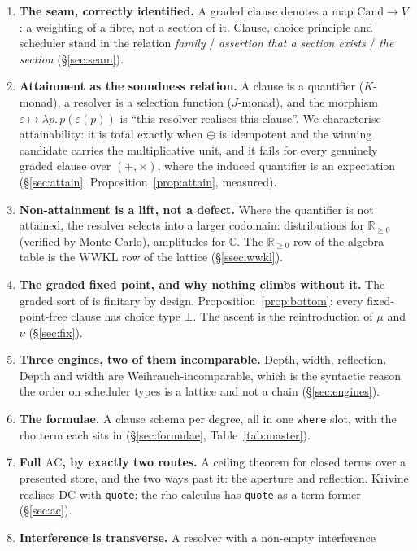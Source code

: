 \documentclass[11pt]{article}
\theoremstyle{definition}
\theoremstyle{plain}
\theoremstyle{remark}
\newcommand{\sumv}{\oplus}
\newcommand{\Rnn}{\mathbb{R}_{\geq 0}}
\newcommand{\Cx}{\mathbb{C}}
\newcommand{\Cand}{\mathrm{Cand}}
\newcommand{\AC}{\mathrm{AC}}
\newcommand{\DC}{\mathrm{DC}}
\newcommand{\WWKL}{\mathrm{WWKL}}
\begin{document}
\begin{enumerate}[label=C\arabic*.,leftmargin=2.6em,itemsep=3pt]
\item \textbf{The seam, correctly identified.} A graded clause denotes a map
$\Cand \to V$: a weighting of a fibre, not a section of it. Clause, choice principle
and scheduler stand in the relation \emph{family} / \emph{assertion that a section
exists} / \emph{the section} (\S\ref{sec:seam}).
\item \textbf{Attainment as the soundness relation.} A clause is a quantifier
($K$-monad), a resolver is a selection function ($J$-monad), and the morphism
$\varepsilon \mapsto \lambda p.\,p(\varepsilon(p))$ is ``this resolver realises this
clause''. We characterise attainability: it is total exactly when $\sumv$ is idempotent
and the winning candidate carries the multiplicative unit, and it fails for every
genuinely graded clause over $(+,\times)$, where the induced quantifier is an
expectation (\S\ref{sec:attain}, Proposition~\ref{prop:attain}, measured).
\item \textbf{Non-attainment is a lift, not a defect.} Where the quantifier is not
attained, the resolver selects into a larger codomain: distributions for $\Rnn$
(verified by Monte Carlo), amplitudes for $\Cx$. The $\Rnn$ row of the algebra table
is the $\WWKL$ row of the lattice (\S\ref{ssec:wwkl}).
\item \textbf{The graded fixed point, and why nothing climbs without it.} The graded
sort of \cite{gradedwhere} is finitary by design. Proposition~\ref{prop:bottom}: every
fixed-point-free clause has choice type $\bot$. The ascent is the reintroduction of
$\mu$ and $\nu$ (\S\ref{sec:fix}).
\item \textbf{Three engines, two of them incomparable.} Depth, width, reflection.
Depth and width are Weihrauch-incomparable, which is the syntactic reason the order on
scheduler types is a lattice and not a chain (\S\ref{sec:engines}).
\item \textbf{The formulae.} A clause schema per degree, all in one \texttt{where}
slot, with the rho term each sits in (\S\ref{sec:formulae}, Table~\ref{tab:master}).
\item \textbf{Full $\AC$, by exactly two routes.} A ceiling theorem for closed terms
over a presented store, and the two ways past it: the aperture and reflection. Krivine
realises $\DC$ with \texttt{quote}; the rho calculus has \texttt{quote} as a term
former (\S\ref{sec:ac}).
\item \textbf{Interference is transverse.} A resolver with a non-empty interference

\end{enumerate}
\end{document}
